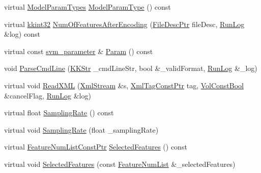 \begin{DoxyCompactItemize}
\item 
virtual \hyperlink{class_k_k_m_l_l_1_1_model_param_a5984a5fe225fdbe8e40fb5ec746a42d0}{Model\+Param\+Types} \hyperlink{class_k_k_m_l_l_1_1_model_param_old_s_v_m_aa6d15fefca6fc49d9c8998b26746e21d}{Model\+Param\+Type} () const 
\item 
virtual \hyperlink{namespace_k_k_b_a8fa4952cc84fda1de4bec1fbdd8d5b1b}{kkint32} \hyperlink{class_k_k_m_l_l_1_1_model_param_old_s_v_m_a77c29c4bb2a1e81788a674aa9c445395}{Num\+Of\+Features\+After\+Encoding} (\hyperlink{namespace_k_k_m_l_l_aa0d0b6ab4ec18868a399b8455b05d914}{File\+Desc\+Ptr} file\+Desc, \hyperlink{class_k_k_b_1_1_run_log}{Run\+Log} \&log) const 
\item 
virtual const \hyperlink{class_k_k_m_l_l_1_1_model_param_old_s_v_m_ae96c3ff03f4145985df9225fdea5aa54}{svm\+\_\+parameter} \& \hyperlink{class_k_k_m_l_l_1_1_model_param_old_s_v_m_a4afafb9212ff974c0e9f4d3bb92341da}{Param} () const 
\item 
void \hyperlink{class_k_k_m_l_l_1_1_model_param_old_s_v_m_a730e73f251b652a0daecb146c761065d}{Parse\+Cmd\+Line} (\hyperlink{class_k_k_b_1_1_k_k_str}{K\+K\+Str} \+\_\+cmd\+Line\+Str, bool \&\+\_\+valid\+Format, \hyperlink{class_k_k_b_1_1_run_log}{Run\+Log} \&\+\_\+log)
\item 
virtual void \hyperlink{class_k_k_m_l_l_1_1_model_param_old_s_v_m_ae255b7209ea485ffc3c1a1de8d02170e}{Read\+X\+ML} (\hyperlink{class_k_k_b_1_1_xml_stream}{Xml\+Stream} \&s, \hyperlink{namespace_k_k_b_a5f1b0b1667d79fec26deeff10c43df23}{Xml\+Tag\+Const\+Ptr} tag, \hyperlink{namespace_k_k_b_a7d390f568e2831fb76b86b56c87bf92f}{Vol\+Const\+Bool} \&cancel\+Flag, \hyperlink{class_k_k_b_1_1_run_log}{Run\+Log} \&log)
\item 
virtual float \hyperlink{class_k_k_m_l_l_1_1_model_param_old_s_v_m_a909975913e139974fb838640eb432d10}{Sampling\+Rate} () const 
\item 
virtual void \hyperlink{class_k_k_m_l_l_1_1_model_param_old_s_v_m_a8cbcee7c6a7d8bb451fb92cf2ae6a96b}{Sampling\+Rate} (float \+\_\+sampling\+Rate)
\item 
virtual \hyperlink{namespace_k_k_m_l_l_a81284b0a14973267260023f9a72da94a}{Feature\+Num\+List\+Const\+Ptr} \hyperlink{class_k_k_m_l_l_1_1_model_param_old_s_v_m_a5e74d2d1fc44df897f89f2039c8f42bd}{Selected\+Features} () const 
\item 
virtual void \hyperlink{class_k_k_m_l_l_1_1_model_param_old_s_v_m_adbd0d2a56de232b16e9350bf5a01a846}{Selected\+Features} (const \hyperlink{class_k_k_m_l_l_1_1_feature_num_list}{Feature\+Num\+List} \&\+\_\+selected\+Features)

\end{DoxyCompactItemize}
